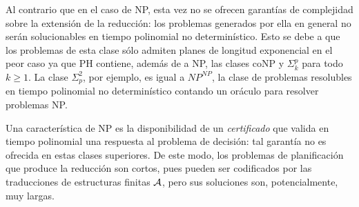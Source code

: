 Al contrario que en el caso de NP,
esta vez no se ofrecen garantías de complejidad sobre la extensión de la
reducción: los problemas \STRIPS generados por ella en general no serán
solucionables en tiempo polinomial no determinístico.
Esto se debe a que los problemas de esta clase sólo admiten planes
de longitud exponencial en el peor caso ya que PH contiene, además de a NP, las
clases coNP y $\Sigma^p_k$ para todo $k\geq 1$. La clase $\Sigma_p^2$, por
ejemplo, es igual a $NP^{NP}$, la clase de problemas resolubles en tiempo
polinomial no determinístico contando un oráculo para resolver problemas NP.

Una característica de NP es la 
disponibilidad de un \textit{certificado} que valida en tiempo polinomial una
respuesta al problema de decisión: tal garantía no es ofrecida en estas clases
superiores.
De este modo, los problemas de planificación que produce la reducción son
cortos, pues pueden ser codificados por las traducciones de estructuras finitas
$\mathcal{A}$, pero sus soluciones son, potencialmente, muy largas.


%

